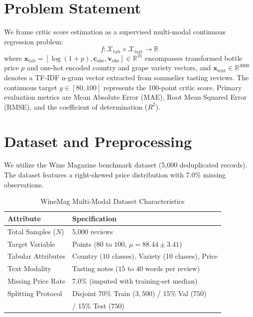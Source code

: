 \documentclass[10pt,journal,compsoc,twocolumn]{IEEEtran}
\begin{document}
\section{Problem Statement}
We frame critic score estimation as a supervised multi-modal continuous regression problem:
\begin{equation}
f: \mathcal{X}_{\text{tab}} \times \mathcal{X}_{\text{text}} \to \mathbb{R}
\end{equation}
where $\mathbf{x}_{\text{tab}} = [\log(1 + p), \mathbf{c}_{\text{ohe}}, \mathbf{v}_{\text{ohe}}] \in \mathbb{R}^{21}$ encompasses transformed bottle price $p$ and one-hot encoded country and grape variety vectors, and $\mathbf{x}_{\text{text}} \in \mathbb{R}^{3000}$ denotes a TF-IDF n-gram vector extracted from sommelier tasting reviews. The continuous target $y \in [80, 100]$ represents the 100-point critic score. Primary evaluation metrics are Mean Absolute Error (MAE), Root Mean Squared Error (RMSE), and the coefficient of determination ($R^2$).

\section{Dataset and Preprocessing}
We utilize the Wine Magazine benchmark dataset (5,000 deduplicated records). The dataset features a right-skewed price distribution with 7.0\% missing observations.

\begin{table}[htbp]
\centering
\caption{WineMag Multi-Modal Dataset Characteristics}
\label{tab:winemag_stats}
\begin{tabular}{ll}
\toprule
\textbf{Attribute} & \textbf{Specification} \\
\midrule
Total Samples ($N$) & 5,000 reviews \\
Target Variable & Points ($80$ to $100$, $\mu = 88.44 \pm 3.41$) \\
Tabular Attributes & Country (10 classes), Variety (10 classes), Price \\
Text Modality & Tasting notes ($15$ to $40$ words per review) \\
Missing Price Rate & 7.0\% (imputed with training-set median) \\
Splitting Protocol & Disjoint 70\% Train ($3,500$) / 15\% Val ($750$) \\
                   & / 15\% Test ($750$) \\
\bottomrule
\end{tabular}
\end{table}
\end{document}
